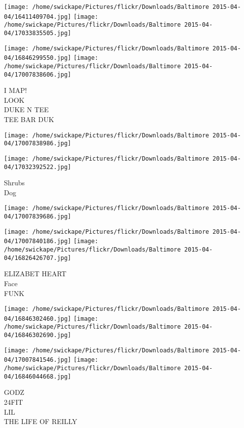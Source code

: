 \documentclass[10pt,letterpaper]{article}
\begin{document}
\texttt{[image: /home/swickape/Pictures/flickr/Downloads/Baltimore 2015-04-04/16411409704.jpg]}
\texttt{[image: /home/swickape/Pictures/flickr/Downloads/Baltimore 2015-04-04/17033835505.jpg]}

\texttt{[image: /home/swickape/Pictures/flickr/Downloads/Baltimore 2015-04-04/16846299550.jpg]}
\texttt{[image: /home/swickape/Pictures/flickr/Downloads/Baltimore 2015-04-04/17007838606.jpg]}

I MAP!\\
LOOK\\
DUKE N TEE\\
TEE BAR DUK\\
\pagebreak

\texttt{[image: /home/swickape/Pictures/flickr/Downloads/Baltimore 2015-04-04/17007838986.jpg]}

\vspace{0.25in}
\texttt{[image: /home/swickape/Pictures/flickr/Downloads/Baltimore 2015-04-04/17032392522.jpg]}

Shrubs\\
Dog\\
\pagebreak

\texttt{[image: /home/swickape/Pictures/flickr/Downloads/Baltimore 2015-04-04/17007839686.jpg]}

\vspace{0.25in}
\texttt{[image: /home/swickape/Pictures/flickr/Downloads/Baltimore 2015-04-04/17007840186.jpg]}
\texttt{[image: /home/swickape/Pictures/flickr/Downloads/Baltimore 2015-04-04/16826426707.jpg]}

ELIZABET HEART\\
Face\\
FUNK\\
\pagebreak

\texttt{[image: /home/swickape/Pictures/flickr/Downloads/Baltimore 2015-04-04/16846302460.jpg]}
\texttt{[image: /home/swickape/Pictures/flickr/Downloads/Baltimore 2015-04-04/16846302690.jpg]}

\texttt{[image: /home/swickape/Pictures/flickr/Downloads/Baltimore 2015-04-04/17007841546.jpg]}
\texttt{[image: /home/swickape/Pictures/flickr/Downloads/Baltimore 2015-04-04/16846044668.jpg]}

GODZ\\
24FIT\\
LIL\\
THE LIFE OF REILLY\\
\pagebreak
\end{document}
